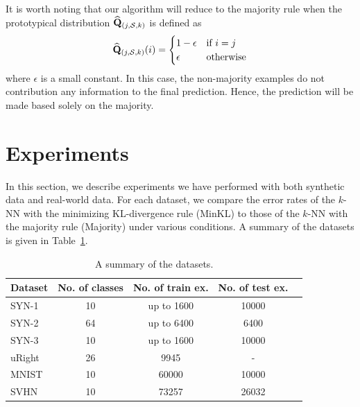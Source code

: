 \documentclass{article}
\begin{document}
It is worth noting that our algorithm will reduce to the majority
rule when the prototypical distribution
$\widehat{\mathbf{Q}}_{(j,\mathcal{S},k)}$ is defined as 
\[
\widehat{\mathbf{Q}}_{(j,\mathcal{S},k)}(i) = \begin{cases} 1-\epsilon &\mbox{if } i = j \\ 
\epsilon & \mbox{otherwise} \end{cases}
\]
where $\epsilon$ is a small constant. In this case, the non-majority
examples do not contribution any information to the final
prediction. Hence, the prediction will be made based solely on the
majority.

\section{Experiments}
\label{sec:results}
In this section, we describe experiments we have performed with both
synthetic data and real-world data. For each dataset, we compare the
error rates of the $k$-NN with the minimizing KL-divergence rule
(MinKL) to those of the $k$-NN with the majority rule (Majority) under
various conditions. A summary of the datasets is given in
Table~\ref{table:results}.

\begin{table}[tb]
\caption{A summary of the datasets.}
\label{table:results}
\vskip 0.1in
\begin{center}
\begin{scriptsize}
\begin{sc}
\begin{tabular}{lcccc}
  \hline
  \abovespace\belowspace
  Dataset & No. of classes & No. of train ex. & No. of test ex. \\
  \hline
  \abovespace
  SYN-1 & 10 & up to 1600 & 10000\\
  SYN-2 & 64 & up to 6400 & 6400\\
  \belowspace
  SYN-3 & 10 & up to 1600 & 10000\\
  \hline
  \abovespace
  uRight & 26 & 9945 & -  \\
  MNIST & 10 & 60000 & 10000 \\
  \belowspace
  SVHN & 10 & 73257 & 26032\\
  \hline
\end{tabular}
\end{sc}
\end{scriptsize}
\end{center}
\vskip -0.1in
\end{table}
\end{document}
